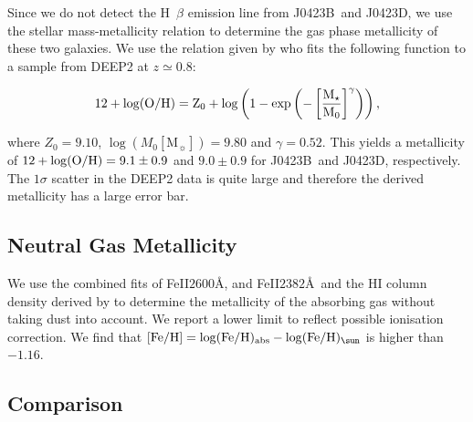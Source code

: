 \documentclass[a4paper,fleqn,usenatbib]{mnras}
\newcommand{\GalB}{J0423B}
\newcommand{\GalD}{J0423D}
\begin{document}
{%
\label{SecMassMetallicity}

Since we do not detect the H~$\beta$ emission line from \GalB\ and \GalD, we use the stellar mass-metallicity relation to determine the gas phase metallicity of these two galaxies. We use the relation given by \mbox{\citet{Zahid2014universal}} who fits the following function to a sample from DEEP2 at $z\simeq 0.8$:

\begin{equation}
12 + \log (\rm{O}/\rm{H}) = Z_0 + \log \left(1 - \exp\left( - \left[\frac{M_{\star}}{M_{0}} \right]^{\gamma}\right)\right) , 
\end{equation}

where $Z_0 = 9.10$,  $\log(M_0 [\text{M}_{\sun}]) = 9.80$ and $\gamma = 0.52$. This yields a metallicity of $12 + \log(\rm{O}/\rm{H}) =  9.1 \pm 0.9$ and $9.0 \pm 0.9$ for \GalB\ and \GalD, respectively. The $1\sigma$ scatter in the DEEP2 data is quite large and therefore the derived metallicity has a large error bar.


\subsection{Neutral Gas Metallicity}
\label{SecHIRESMetallicity}

We use the combined fits of FeII$2600$\AA, and FeII$2382$\AA\ and the HI column density derived by \mbox{\citep{Rao2006damped}} to determine the metallicity of the absorbing gas without taking dust into account. We report a lower limit to reflect possible ionisation correction. We find that $[\rm{Fe/H}] = \log(\rm {Fe}/\rm {H})_{\rm abs} - \log(\rm{ Fe}/\rm {H})_{\sun}$ is higher than $-1.16$.



\subsection{Comparison}

}
\end{document}

